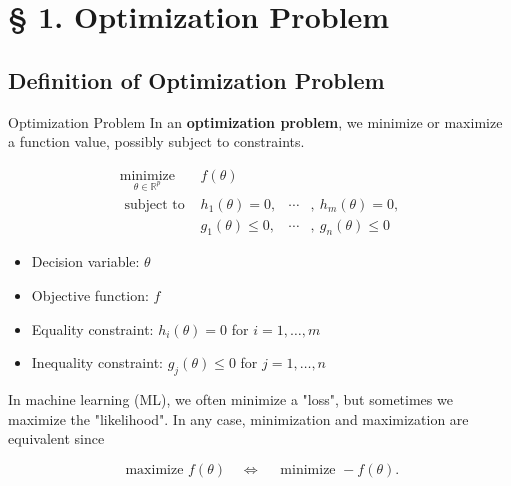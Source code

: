 \section{§ 1. Optimization Problem}

\subsection{Definition of Optimization Problem}

\begin{frame}[allowframebreaks]

\begin{mydefinitionblock}{1.1}{Optimization Problem}
    In an \textbf{optimization problem}, we minimize or maximize a function value, possibly subject to constraints.

    $$
    \begin{array}{ll}
    \underset{\theta \in \mathbb{R}^{p}}{\operatorname{minimize}} & f(\theta) \\
    \text { subject to } & h_{1}(\theta)=0, & \cdots & , \ h_{m}(\theta)=0, \\
    & g_{1}(\theta) \le 0, & \cdots & , \ g_{n}(\theta) \le 0
    \end{array}
    $$

    \begin{itemize}
        \item Decision variable: $\theta$
        \item Objective function: $f$
        \item Equality constraint: $h_{i}(\theta)=0$ for $i=1, \ldots, m$
        \item Inequality constraint: $g_{j}(\theta) \leq 0$ for $j=1, \ldots, n$
    \end{itemize}
\end{mydefinitionblock}

\end{frame}


\begin{frame}[allowframebreaks]

In machine learning (ML), we often minimize a "loss", but sometimes we maximize the "likelihood".
In any case, minimization and maximization are equivalent since

$$
\text { maximize } f(\theta) \quad \Leftrightarrow \quad \text { minimize }-f(\theta).
$$

\end{frame}

